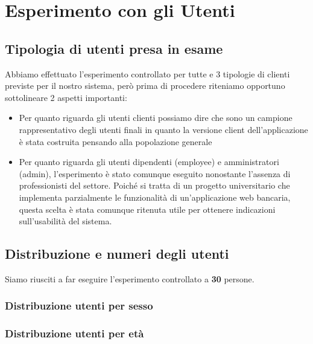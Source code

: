 \section{Esperimento con gli Utenti}

\subsection{Tipologia di utenti presa in esame}
Abbiamo effettuato l'esperimento controllato per tutte e 3 tipologie di clienti previste per il nostro sistema, però prima di procedere riteniamo opportuno sottolineare 2 aspetti importanti:
\begin{itemize}
	\item Per quanto riguarda gli utenti clienti possiamo dire che sono un campione rappresentativo degli utenti finali in quanto la versione client dell'applicazione è stata costruita pensando alla popolazione generale
	\item Per quanto riguarda gli utenti dipendenti (employee) e amministratori (admin), l'esperimento è stato comunque eseguito nonostante l'assenza di professionisti del settore. Poiché si tratta di un progetto universitario che implementa parzialmente le funzionalità di un'applicazione web bancaria, questa scelta è stata comunque ritenuta utile per ottenere indicazioni sull'usabilità del sistema.
\end{itemize}

\subsection{Distribuzione e numeri degli utenti}
Siamo riusciti a far eseguire l'esperimento controllato a \textbf{30} persone.
\subsubsection{Distribuzione utenti per sesso}
\begin{center}
\end{center}

\subsubsection{Distribuzione utenti per età}
\begin{center}
\end{center}

